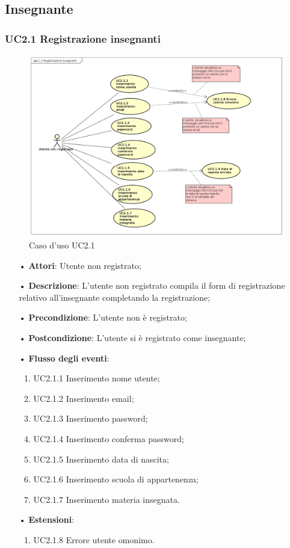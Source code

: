 
\subsection{Insegnante}

\subsubsection{UC2.1 Registrazione insegnanti}

\begin{figure}[H]
\centering
\includegraphics[width=17cm]{img/UC21.png} 
\caption{Caso d'uso UC2.1}
\end{figure}

\begin{itemize}
	\item[•] \textbf{Attori}: Utente non registrato;
	\item[•] \textbf{Descrizione}:  L’utente non registrato compila il form di registrazione relativo all’insegnante completando la registrazione;
	\item[•] \textbf{Precondizione}: L’utente non è registrato;
	\item[•] \textbf{Postcondizione}: L’utente si è registrato come insegnante;
	\item[•] \textbf{Flusso degli eventi}:
		\begin{enumerate}
			\item UC2.1.1 Inserimento nome utente;
			\item UC2.1.2 Inserimento email;
			\item UC2.1.3 Inserimento password;
			\item UC2.1.4 Inserimento conferma password;
			\item UC2.1.5 Inserimento data di nascita;
			\item UC2.1.6 Inserimento scuola di appartenenza;
			\item UC2.1.7 Inserimento materia insegnata.
		\end{enumerate}
	\item[•] \textbf{Estensioni}:
		\begin{enumerate}
			\item UC2.1.8 Errore utente omonimo.
		\end{enumerate}
\end{itemize}

